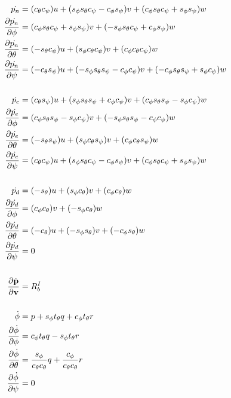 \documentclass[a4paper]{article}
\begin{document}
\begin{align*}
  \dot{p_n} &= (\ctheta \cpsi)u + (\sphi \stheta \cpsi - \cphi \spsi)v +
    (\cphi \stheta \cpsi + \sphi \spsi)w \\
  \frac{\partial \dot{p_n}}{\partial \phi} &= (\cphi \stheta \cpsi + \sphi
    \spsi) v + (-\sphi \stheta \cpsi + \cphi \spsi) w \\
  \frac{\partial \dot{p_n}}{\partial \theta} &= (-\stheta \cpsi) u + (\sphi
    \ctheta \cpsi) v + (\cphi \ctheta \cpsi) w \\
  \frac{\partial \dot{p_n}}{\partial \psi} &= (-\ctheta \spsi) u +(-\sphi
    \stheta \spsi - \cphi \cpsi) v + (-\cphi \stheta \spsi + \sphi \cpsi)
    w \\
  \\
  \dot{p_e} &= (\ctheta \spsi)u + (\sphi \stheta \spsi + \cphi \cpsi)v +
    (\cphi \stheta \spsi - \sphi \cpsi)w \\
  \frac{\partial \dot{p_e}}{\partial \phi} &= (\cphi \stheta \spsi - \sphi
    \cpsi) v + (-\sphi \stheta \spsi - \cphi \cpsi) w \\
  \frac{\partial \dot{p_e}}{\partial \theta} &= (-\stheta \spsi)u + (\sphi
    \ctheta \spsi)v + (\cphi \ctheta \spsi)w \\
  \frac{\partial \dot{p_e}}{\partial \psi} &= (\ctheta \cpsi) u + (\sphi \stheta
    \cpsi - \cphi \spsi) v + (\cphi \stheta \cpsi + \sphi \spsi) w \\
  \\
  \dot{p_d} &= (-\stheta)u + (\sphi \ctheta)v + (\cphi \ctheta)w \\
  \frac{\partial \dot{p_d}}{\partial \phi} &= (\cphi \ctheta) v + (-\sphi
    \ctheta) w \\
  \frac{\partial \dot{p_d}}{\partial \theta} &= (-\ctheta) u + (-\sphi \stheta)
    v + (-\cphi \stheta) w \\
  \frac{\partial \dot{p_d}}{\partial \psi} &= 0 \\
  \\
  \frac{\partial \dot{\vect{p}}}{\partial {\vect{v}}} &= R_b^I \\
  \\
  \dot{\phi} &= p + \sphi \ttheta q + \cphi \ttheta r \\
  \frac{\partial \dot{\phi}}{\partial \phi} &= \cphi \ttheta q -
    \sphi \ttheta r \\
  \frac{\partial \dot{\phi}}{\partial \theta} &= \frac{\sphi}{\ctheta \ctheta} q
    + \frac{\cphi}{\ctheta \ctheta} r \\
  \frac{\partial \dot{\phi}}{\partial \psi} &= 0 \\

\end{align*}
\end{document}
